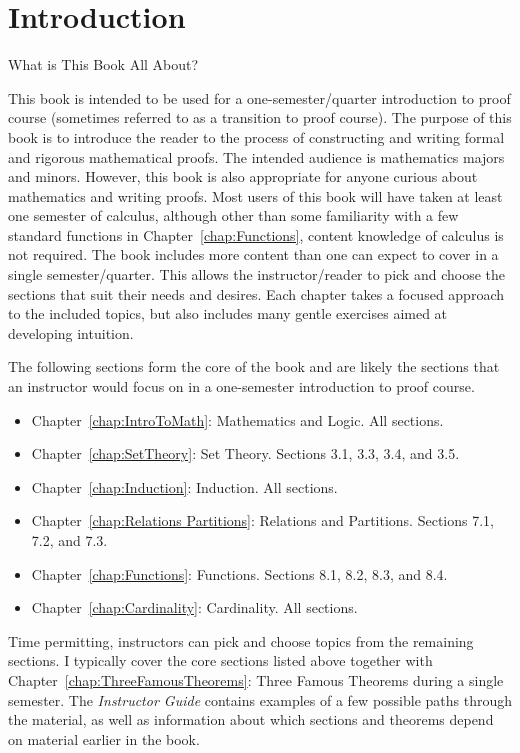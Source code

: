 \chapter{Introduction}\label{chap:intro}


\begin{section}{What is This Book All About?}

This book is intended to be used for a one-semester/quarter introduction to proof course (sometimes referred to as a transition to proof course). The purpose of this book is to introduce the reader to the process of constructing and writing formal and rigorous mathematical proofs. The intended audience is mathematics majors and minors. However, this book is also appropriate for anyone curious about mathematics and writing proofs. Most users of this book will have taken at least one semester of calculus, although other than some familiarity with a few standard functions in Chapter~\ref{chap:Functions}, content knowledge of calculus is not required. The book includes more content than one can expect to cover in a single semester/quarter. This allows the instructor/reader to pick and choose the sections that suit their needs and desires. Each chapter takes a focused approach to the included topics, but also includes many gentle exercises aimed at developing intuition.

The following sections form the core of the book and are likely the sections that an instructor would focus on in a one-semester introduction to proof course.
\begin{itemize}
\item Chapter~\ref{chap:IntroToMath}: Mathematics and Logic. All sections.
\item Chapter~\ref{chap:SetTheory}: Set Theory. Sections 3.1, 3.3, 3.4, and 3.5.
\item Chapter~\ref{chap:Induction}: Induction. All sections.
\item Chapter~\ref{chap:Relations Partitions}: Relations and Partitions. Sections 7.1, 7.2, and 7.3.
\item Chapter~\ref{chap:Functions}: Functions. Sections 8.1, 8.2, 8.3, and 8.4.
\item Chapter~\ref{chap:Cardinality}: Cardinality. All sections.
\end{itemize}
Time permitting, instructors can pick and choose topics from the remaining sections.  I typically cover the core sections listed above together with Chapter~\ref{chap:ThreeFamousTheorems}: Three Famous Theorems during a single semester. The \emph{Instructor Guide} contains examples of a few possible paths through the material, as well as information about which sections and theorems depend on material earlier in the book.


\end{section}
